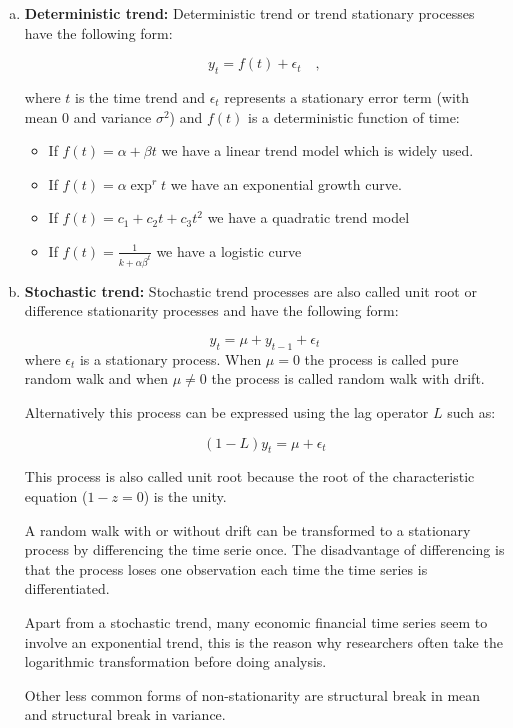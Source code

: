 \begin{enumerate}[(a)]
\item \textbf{Deterministic trend:} Deterministic trend or trend stationary
processes have the following form:

\[
y_t = f(t) + \epsilon_{t} \quad ,
\]

\noindent where $t$ is the time trend and $\epsilon_{t}$ represents a stationary
error term (with mean 0 and variance $\sigma^2$) and $f(t)$ is a deterministic
function of time:
\begin{itemize}
\item If $f(t) = \alpha + \beta t$ we have a linear trend model which is widely used. 
\item If $f(t)= \alpha \exp^rt$ we have an exponential growth curve.
\item If $f(t) = c_1 + c_2t + c_3 t^2$ we have a quadratic trend model
\item If $f(t) = \frac{1}{k+\alpha \beta ^t }$ we have a logistic curve
\end{itemize}
\item \textbf{Stochastic trend:} Stochastic trend processes are also called unit
root or difference stationarity processes and have the following form:

\[
y_t = \mu + y_{t-1} + \epsilon_t
\]
\noindent where $\epsilon_t$ is a stationary process. When $\mu = 0 $ the
process is called pure random walk and when $\mu \neq 0$  the process is called
random walk with drift.

Alternatively this process can be expressed using the lag operator $L$ such as:

\[
(1-L) y_t = \mu  + \epsilon_t
\]

This process is also called unit root because the root of the characteristic
equation ($1-z = 0$) is the unity.  

A random walk with or without drift can be transformed to a stationary process
by differencing the time serie once. The disadvantage of differencing is that
the process loses one observation each time the time series is differentiated.

Apart from a stochastic trend, many economic financial time series seem to
involve an exponential trend, this is the reason why researchers often take the
logarithmic transformation before doing analysis.

Other less common forms of non-stationarity are structural break in mean and
structural break in variance. 
\end{enumerate}

